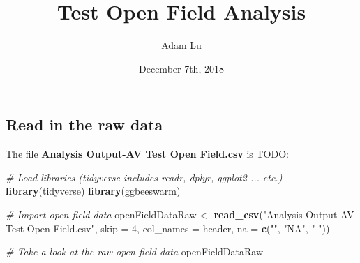 \documentclass[]{article}
\title{Test Open Field Analysis}
\author{Adam Lu}
\date{December 7th, 2018}
\newenvironment{Shaded}{\begin{snugshade}}{\end{snugshade}}
\newcommand{\KeywordTok}[1]{\textcolor[rgb]{0.13,0.29,0.53}{\textbf{#1}}}
\newcommand{\DataTypeTok}[1]{\textcolor[rgb]{0.13,0.29,0.53}{#1}}
\newcommand{\DecValTok}[1]{\textcolor[rgb]{0.00,0.00,0.81}{#1}}
\newcommand{\StringTok}[1]{\textcolor[rgb]{0.31,0.60,0.02}{#1}}
\newcommand{\CommentTok}[1]{\textcolor[rgb]{0.56,0.35,0.01}{\textit{#1}}}
\newcommand{\NormalTok}[1]{#1}
\begin{document}
\maketitle

\subsection{Read in the raw data}\label{read-in-the-raw-data}

The file \textbf{Analysis Output-AV Test Open Field.csv} is TODO:

\begin{Shaded}
\begin{Highlighting}[]
\CommentTok{# Load libraries (tidyverse includes readr, dplyr, ggplot2 ... etc.)}
\KeywordTok{library}\NormalTok{(tidyverse)}
\KeywordTok{library}\NormalTok{(ggbeeswarm)}
\end{Highlighting}
\end{Shaded}

\begin{Shaded}
\begin{Highlighting}[]
\CommentTok{# Import open field data}
\NormalTok{openFieldDataRaw <-}\StringTok{ }\KeywordTok{read_csv}\NormalTok{(}\StringTok{"Analysis Output-AV Test Open Field.csv"}\NormalTok{, }\DataTypeTok{skip =} \DecValTok{4}\NormalTok{, }
                            \DataTypeTok{col_names =}\NormalTok{ header, }\DataTypeTok{na =} \KeywordTok{c}\NormalTok{(}\StringTok{""}\NormalTok{, }\StringTok{"NA"}\NormalTok{, }\StringTok{"-"}\NormalTok{))}

\CommentTok{# Take a look at the raw open field data}
\NormalTok{openFieldDataRaw}
\end{Highlighting}
\end{Shaded}
\end{document}
